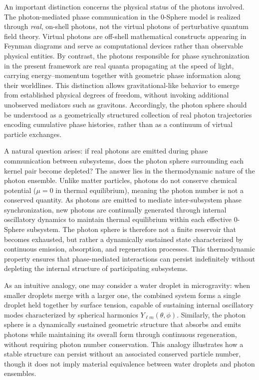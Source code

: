 \documentclass[%
 reprint,
 amsmath,amssymb,
 aps,
 prb,
]{revtex4-2}
\numberwithin{equation}{section}
\begin{document}
An important distinction concerns the physical status of the photons involved. The photon-mediated phase communication in the 0-Sphere model is realized through \emph{real}, on-shell photons, not the virtual photons of perturbative quantum field theory. Virtual photons are off-shell mathematical constructs appearing in Feynman diagrams and serve as computational devices rather than observable physical entities. By contrast, the photons responsible for phase synchronization in the present framework are real quanta propagating at the speed of light, carrying energy--momentum together with geometric phase information along their worldlines. This distinction allows gravitational-like behavior to emerge from established physical degrees of freedom, without invoking additional unobserved mediators such as gravitons. Accordingly, the photon sphere should be understood as a geometrically structured collection of real photon trajectories encoding cumulative phase histories, rather than as a continuum of virtual particle exchanges.

A natural question arises: if real photons are emitted during phase communication between subsystems, does the photon sphere surrounding each kernel pair become depleted? The answer lies in the thermodynamic nature of the photon ensemble. Unlike matter particles, photons do not conserve chemical potential ($\mu = 0$ in thermal equilibrium), meaning the photon number is not a conserved quantity. As photons are emitted to mediate inter-subsystem phase synchronization, new photons are continually generated through internal oscillatory dynamics to maintain thermal equilibrium within each effective 0-Sphere subsystem. The photon sphere is therefore not a finite reservoir that becomes exhausted, but rather a dynamically sustained state characterized by continuous emission, absorption, and regeneration processes. This thermodynamic property ensures that phase-mediated interactions can persist indefinitely without depleting the internal structure of participating subsystems.

As an intuitive analogy, one may consider a water droplet in microgravity: when smaller droplets merge with a larger one, the combined system forms a single droplet held together by surface tension, capable of sustaining internal oscillatory modes characterized by spherical harmonics $Y_{\ell m}(\theta,\phi)$. Similarly, the photon sphere is a dynamically sustained geometric structure that absorbs and emits photons while maintaining its overall form through continuous regeneration, without requiring photon number conservation. This analogy illustrates how a stable structure can persist without an associated conserved particle number, though it does not imply material equivalence between water droplets and photon ensembles.
\end{document}
